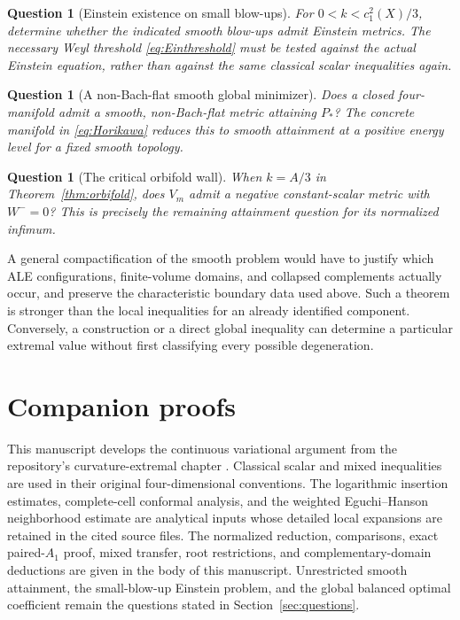 \documentclass[11pt,a4paper]{article}
\newtheorem{question}[theorem]{Question}
\theoremstyle{definition}\newtheorem{definition}[theorem]{Definition}
\theoremstyle{remark}\newtheorem{remark}[theorem]{Remark}
\begin{document}
\begin{question}[Einstein existence on small blow-ups]
For $0<k<c_1^2(X)/3$, determine whether the indicated smooth blow-ups admit Einstein metrics. The necessary Weyl threshold \eqref{eq:Einthreshold} must be tested against the actual Einstein equation, rather than against the same classical scalar inequalities again.
\end{question}
\begin{question}[A non-Bach-flat smooth global minimizer]
Does a closed four-manifold admit a smooth, non-Bach-flat metric attaining $P_*$? The concrete manifold in \eqref{eq:Horikawa} reduces this to smooth attainment at a positive energy level for a fixed smooth topology.
\end{question}
\begin{question}[The critical orbifold wall]
When $k=A/3$ in Theorem~\ref{thm:orbifold}, does $V_m$ admit a negative constant-scalar metric with $W^-=0$? This is precisely the remaining attainment question for its normalized infimum.
\end{question}
A general compactification of the smooth problem would have to justify which ALE configurations, finite-volume domains, and collapsed complements actually occur, and preserve the characteristic boundary data used above. Such a theorem is stronger than the local inequalities for an already identified component. Conversely, a construction or a direct global inequality can determine a particular extremal value without first classifying every possible degeneration.

\appendix
\section{Companion proofs}
This manuscript develops the continuous variational argument from the repository's curvature-extremal chapter \cite{RepoVariation}. Classical scalar and mixed inequalities are used in their original four-dimensional conventions. The logarithmic insertion estimates, complete-cell conformal analysis, and the weighted Eguchi--Hanson neighborhood estimate are analytical inputs whose detailed local expansions are retained in the cited source files. The normalized reduction, comparisons, exact paired-$A_1$ proof, mixed transfer, root restrictions, and complementary-domain deductions are given in the body of this manuscript. Unrestricted smooth attainment, the small-blow-up Einstein problem, and the global balanced optimal coefficient remain the questions stated in Section~\ref{sec:questions}.
\end{document}
